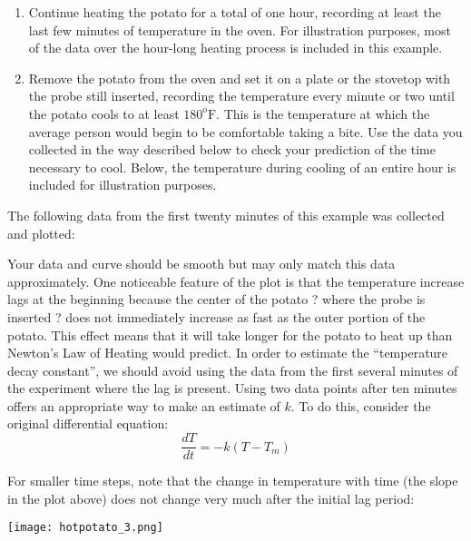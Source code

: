 \documentclass{ximera}
\begin{document}
\begin{enumerate}
\item Continue heating the potato for a total of one hour, recording at least the last few minutes of temperature in the oven.  For illustration purposes, most of the data over the hour-long heating process is included in this example.
\item Remove the potato from the oven and set it on a plate or the stovetop with the probe still inserted, recording the temperature every minute or two until the potato cools to at least $180^{\text{o}}\text{F}$. This is the temperature at which the average person would begin to be comfortable taking a bite.  Use the data you collected in the way described below to check your prediction of the time necessary to cool.  Below, the temperature during cooling of an entire hour is included for illustration purposes.
\end{enumerate}

The following data from the first twenty minutes of this example was collected and plotted:

\begin{center}  
\end{center}

Your data and curve should be smooth but may only match this data approximately.  One noticeable feature of the plot is that the temperature increase lags at the beginning because the center of the potato ? where the probe is inserted ? does not immediately increase as fast as the outer portion of the potato.  This effect means that it will take longer for the potato to heat up than Newton's Law of Heating would predict.  In order to estimate the ``temperature decay constant'', we should avoid using the data from the first several minutes of the experiment where the lag is present.  Using two data points after ten minutes offers an appropriate way to make an estimate of $k$.  To do this, consider the original differential equation:
\[
\frac{dT}{dt}=-k(T-T_m)
\]

For smaller time steps, note that the change in temperature with time (the slope in the plot above) does not change very much after the initial lag period:

\begin{image}
\texttt{[image: hotpotato\_3.png]}
\end{image}
\end{document}
